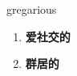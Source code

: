 
\begin{frame}
{\huge gregarious}
\begin{center}
\begin{enumerate}\Large
  \item \textbf{爱社交的}
  \item \textbf{群居的}
\end{enumerate}
\end{center}
\end{frame}
